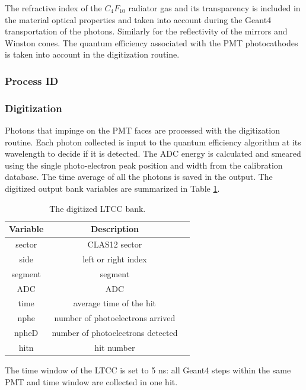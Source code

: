 The refractive index of the $C_4F_{10}$ radiator gas and its transparency is included in the material optical properties and taken
into account during the Geant4 transportation of the photons.
Similarly for the reflectivity of the mirrors and Winston cones.
The quantum efficiency associated with the PMT photocathodes is taken into account in
the digitization routine.

\subsubsection{Process ID}


\subsubsection{Digitization}

Photons that impinge on the PMT faces are processed with the digitization routine.
Each photon collected is input to the quantum efficiency algorithm at its wavelength to decide if it is detected.
The ADC energy is calculated and smeared using the single photo-electron peak position and width from the calibration database.
The time average of all the photons is saved in the output.
The digitized output bank variables are summarized in Table \ref{tab:ltccBank}.

\begin{table}[h]
	\begin{center}
		\begin{tabular}{| c | c | c |}
			\hline \hline
			Variable & Description                                         \\
			\hline
             sector  &                                     CLAS12 sector   \\
               side  &                               left or right index   \\
            segment  &                                           segment   \\
                ADC  &                                               ADC   \\
               time  &                           average time of the hit   \\
               nphe  &                  number of photoelectrons arrived   \\
              npheD  &                 number of photoelectrons detected   \\
               hitn  &                                        hit number   \\
			\hline \hline
		\end{tabular}
	\end{center}
	\caption{The digitized LTCC bank.}\label{tab:ltccBank}
\end{table}

The time window  of the LTCC is set to 5 ns: all Geant4 steps within the same PMT and time window are collected in one hit.
